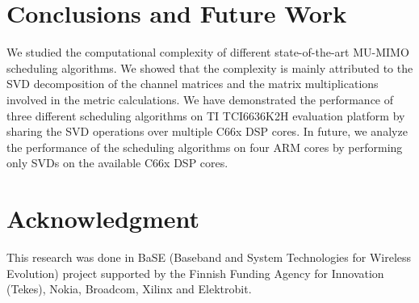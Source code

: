 \documentclass[conference,letterpaper]{./../../IEEE/IEEEtran}
\begin{document}
\acresetall {}
\section{Conclusions and Future Work}
\label{sec:conclusion}
We studied the computational complexity of different state-of-the-art MU-MIMO scheduling algorithms. We showed that the complexity is mainly attributed to the SVD decomposition of the channel matrices and the matrix multiplications involved in the metric calculations. We have demonstrated the performance of three different scheduling algorithms on TI TCI6636K2H evaluation platform by sharing the SVD operations over multiple C66x DSP cores. In future, we analyze the performance of the scheduling algorithms on four ARM cores by performing only SVDs on the available C66x DSP cores.

\section*{Acknowledgment}
This research was done in BaSE (Baseband and System Technologies for Wireless Evolution) project supported by the Finnish Funding Agency for Innovation (Tekes), Nokia, Broadcom, Xilinx and Elektrobit.



%
\end{document}

